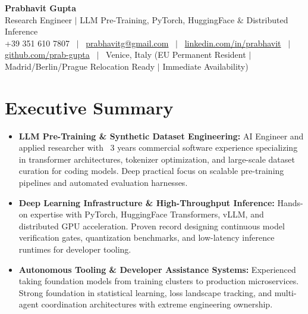 \documentclass[a4paper,10pt]{article}
\begin{document}
\begin{minipage}[c]{0.80\textwidth}
  {\Huge\bfseries Prabhavit Gupta}\\[3pt]
  {\color{accent}\large Research Engineer $\vert$ LLM Pre-Training, PyTorch, HuggingFace $\&$ Distributed Inference}\\[6pt]
  {\footnotesize +39 351 610 7807 ~$\vert$~
  \href{mailto:prabhavitg@gmail.com}{prabhavitg@gmail.com} ~$\vert$~
  \href{https://www.linkedin.com/in/prabhavit/}{linkedin.com/in/prabhavit} ~$\vert$~
  \href{https://github.com/prab-gupta}{github.com/prab-gupta} ~$\vert$~
  Venice, Italy (EU Permanent Resident $\vert$ Madrid/Berlin/Prague Relocation Ready $\vert$ Immediate Availability)}
\end{minipage}\hfill

\vspace{6pt}

\section{Executive Summary}
\begin{itemize}
  \item \textbf{LLM Pre-Training \& Synthetic Dataset Engineering:} AI Engineer and applied researcher with ~3 years commercial software experience specializing in transformer architectures, tokenizer optimization, and large-scale dataset curation for coding models. Deep practical focus on scalable pre-training pipelines and automated evaluation harnesses.
  \item \textbf{Deep Learning Infrastructure \& High-Throughput Inference:} Hands-on expertise with PyTorch, HuggingFace Transformers, vLLM, and distributed GPU acceleration. Proven record designing continuous model verification gates, quantization benchmarks, and low-latency inference runtimes for developer tooling.
  \item \textbf{Autonomous Tooling \& Developer Assistance Systems:} Experienced taking foundation models from training clusters to production microservices. Strong foundation in statistical learning, loss landscape tracking, and multi-agent coordination architectures with extreme engineering ownership.
\end{itemize}

\end{document}
